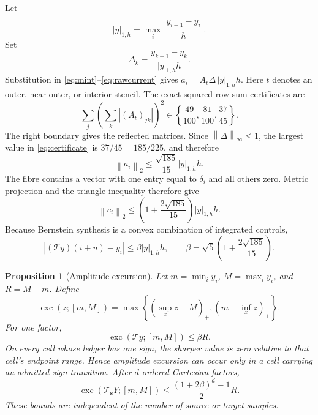\documentclass[journal]{IEEEtran}
\newtheorem{proposition}{Proposition}
\newcommand{\Tcal}{\mathcal{T}}
\newcommand{\norm}[1]{\left\lVert#1\right\rVert}
\begin{document}
Let
\[
 |y|_{1,h}=\max_i\frac{|y_{i+1}-y_i|}{h}.
\]
Set
\[
\Delta_k=\frac{y_{k+1}-y_k}{|y|_{1,h}h}.
\]
Substitution in \eqref{eq:mint}--\eqref{eq:rawcurrent} gives
\(a_i=A_t\Delta\,|y|_{1,h}h\). Here \(t\) denotes an outer, near-outer,
or interior stencil. The exact squared row-sum certificates are
\begin{equation}
 \sum_j\left(\sum_k |(A_t)_{jk}|\right)^2
 \in\left\{\frac{49}{100},\frac{81}{100},\frac{37}{45}\right\}.
 \label{eq:certificate}
\end{equation}
The right boundary gives the reflected matrices. Since
\(\norm{\Delta}_\infty\leq1\), the largest value in
\eqref{eq:certificate} is \(37/45=185/225\), and therefore
\begin{equation}
 \norm{a_i}_2\leq\frac{\sqrt{185}}{15}|y|_{1,h}h.
 \label{eq:rawbound}
\end{equation}
The fibre contains a vector with one entry equal to \(\delta_i\) and all
others zero. Metric projection and the triangle inequality therefore give
\begin{equation}
 \norm{c_i}_2
 \leq\left(1+\frac{2\sqrt{185}}{15}\right)|y|_{1,h}h.
 \label{eq:currentbound}
\end{equation}
Because Bernstein synthesis is a convex combination of integrated controls,
\begin{equation}
 |(\Tcal y)(i+u)-y_i|
 \leq\beta |y|_{1,h}h,\qquad
\beta=\sqrt5\left(1+\frac{2\sqrt{185}}{15}\right).
\label{eq:localbound}
\end{equation}

\begin{proposition}[Amplitude excursion]
Let \(m=\min_i y_i\), \(M=\max_i y_i\), and \(R=M-m\). Define
\begin{equation}
 \operatorname{exc}(z;[m,M])=
 \max\left\{(\sup_xz-M)_+,(m-\inf_xz)_+\right\}.
 \label{eq:excursiondef}
\end{equation}
For one factor,
\begin{equation}
 \operatorname{exc}(\Tcal y;[m,M])\leq\beta R.
 \label{eq:excursionone}
\end{equation}
On every cell whose ledger has one sign, the sharper value is zero relative
to that cell's endpoint range. Hence amplitude excursion can occur only in a
cell carrying an admitted sign transition. After \(d\) ordered Cartesian
factors,
\begin{equation}
 \operatorname{exc}(\Tcal_{\bm s}Y;[m,M])
 \leq\frac{(1+2\beta)^d-1}{2}R.
 \label{eq:excursiond}
\end{equation}
These bounds are independent of the number of source or target samples.
\end{proposition}
\end{document}
